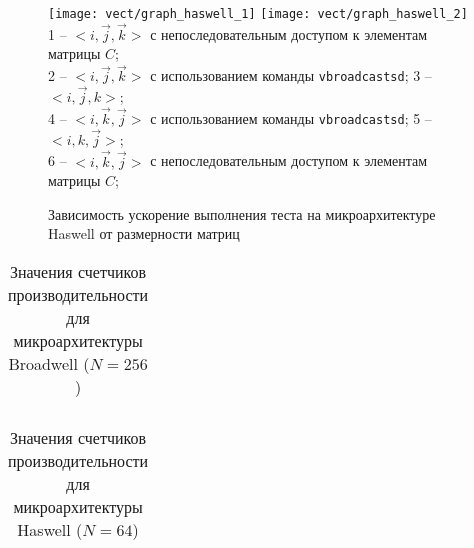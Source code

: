 \begin{figure}
    \centering
	{\texttt{[image: vect/graph\_haswell\_1]}}%
	{\texttt{[image: vect/graph\_haswell\_2]}} \\
	 1 -- $<i, \vec{j}, \vec{k}>$ с непоследовательным доступом к элементам матрицы $C$; \\
	 2 -- $<i, \vec{j}, \vec{k}>$ с использованием команды \texttt{vbroadcastsd}; 3 -- $<i, \vec{j}, k>$; \\
	 4 -- $<i, \vec{k}, \vec{j}>$ с использованием команды \texttt{vbroadcastsd}; 5 -- $<i, k, \vec{j}>$; \\
	 6 -- $<i, \vec{k}, \vec{j}>$ с непоследовательным доступом к элементам матрицы $C$;
	 \caption{Зависимость ускорение выполнения теста на микроархитектуре Haswell от размерности матриц}
    \label{graph:graph_haswell}
\end{figure}

\begin{sidewaystable}
 \raggedright
  \bigskip
  \caption{Значения счетчиков производительности для микроархитектуры Broadwell ($N = 256$)}\label{table:perf-broadwell-vect}%
  \begin{tabular}[c]{|m{3.6cm}|p{1.3cm}|p{1.8cm}|p{1.5cm}|p{2cm}|p{1.8cm}|p{2cm}|p{2cm}|p{1cm}|p{1.7cm}|p{1.75cm}l|}
  \hline
  \hline
  
  \hline
  \end{tabular}
\end{sidewaystable}
\begin{sidewaystable}
 \raggedright
  \bigskip
   \caption{Значения счетчиков производительности для микроархитектуры Haswell ($N = 64$)}\label{table:perf-haswell-vect}%
  \begin{tabular}[c]{|m{5cm}|p{1.5cm}|p{1.5cm}|p{1.5cm}|p{1.5cm}|p{1.5cm}|p{1.5cm}|p{1.8cm}|p{1cm}|p{1.65cm}|p{1.75cm}l|}
  \hline
  \hline
  
  \end{tabular}
\end{sidewaystable}

